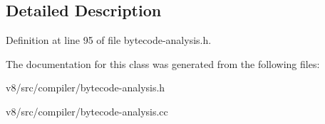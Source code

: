 \subsection{Detailed Description}


Definition at line 95 of file bytecode-\/analysis.\+h.



The documentation for this class was generated from the following files\+:\begin{DoxyCompactItemize}
\item 
v8/src/compiler/bytecode-\/analysis.\+h\item 
v8/src/compiler/bytecode-\/analysis.\+cc\end{DoxyCompactItemize}
